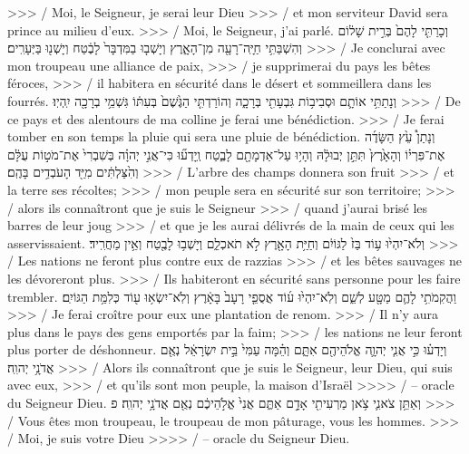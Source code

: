\begin{paracol}[1]
  {>>> / Moi, le Seigneur, je serai leur Dieu
    >>> / et mon serviteur David sera prince au milieu d’eux.
    >>> / Moi, le Seigneur, j’ai parlé.}
  \verset
  {וְכָרַתִּ֤י לָהֶם֙ בְּרִ֣ית שָׁל֔וֹם
    וְהִשְׁבַּתִּ֥י חַיָּֽה־רָעָ֖ה מִן־הָאָ֑רֶץ
    וְיָשְׁב֤וּ בַמִּדְבָּר֙ לָבֶ֔טַח וְיָשְׁנ֖וּ בַּיְּעָרִֽים׃}
  {>>> / Je conclurai avec mon troupeau une alliance de paix,
    >>> / je supprimerai du pays les bêtes féroces,
    >>> / il habitera en sécurité dans le désert et sommeillera dans les fourrés.}
  \verset
  {וְנָתַתִּ֥י אוֹתָ֛ם וּסְבִיב֥וֹת גִּבְעָתִ֖י בְּרָכָ֑ה
    וְהוֹרַדְתִּ֤י הַגֶּ֙שֶׁם֙ בְּעִתּ֔וֹ גִּשְׁמֵ֥י בְרָכָ֖ה יִֽהְיֽוּ׃}
  {>>> / De ce pays et des alentours de ma colline je ferai une bénédiction.
    >>> / Je ferai tomber en son temps la pluie qui sera une pluie de bénédiction.}
  \verset
  {וְנָתַן֩ עֵ֙ץ הַשָּׂדֶ֜ה אֶת־פִּרְי֗וֹ
    וְהָאָ֙רֶץ֙ תִּתֵּ֣ן יְבוּלָ֔הּ
    וְהָי֥וּ עַל־אַדְמָתָ֖ם לָבֶ֑טַח
    וְֽיָדְע֞וּ כִּי־אֲנִ֣י יְהוָ֗ה
    בְּשִׁבְרִי֙ אֶת־מֹט֣וֹת עֻלָּ֔ם
    וְהִ֙צַּלְתִּ֔ים מִיַּ֖ד הָעֹבְדִ֥ים בָּהֶֽם׃}
  {>>> / L’arbre des champs donnera son fruit
    >>> / et la terre ses récoltes;
    >>> / mon peuple sera en sécurité sur son territoire;
    >>> / alors ils connaîtront que je suis le Seigneur
    >>> / quand j’aurai brisé les barres de leur joug
    >>> / et que je les aurai délivrés de la main de ceux qui les asservissaient.}
  \verset
  {וְלֹא־יִהְי֙וּ ע֥וֹד בַּז֙ לַגּוֹיִ֔ם
    וְחַיַּ֥ת הָאָ֖רֶץ לֹ֣א תֹאכְלֵ֑ם
    וְיָשְׁב֥וּ לָבֶ֖טַח וְאֵ֥ין מַחֲרִֽיד׃}
  {>>> / Les nations ne feront plus contre eux de razzias
    >>> / et les bêtes sauvages ne les dévoreront plus.
    >>> / Ils habiteront en sécurité sans personne pour les faire trembler.}
  \verset
  {וַהֲקִמֹתִ֥י לָהֶ֛ם מַטָּ֖ע לְשֵׁ֑ם
    וְלֹֽא־יִהְי֙וּ ע֜וֹד אֲסֻפֵ֤י רָעָב֙ בָּאָ֔רֶץ
    וְלֹֽא־יִשְׂא֥וּ ע֖וֹד כְּלִמַּ֥ת הַגּוֹיִֽם׃}
  {>>> / Je ferai croître pour eux une plantation de renom.
    >>> / Il n’y aura plus dans le pays des gens emportés par la faim;
    >>> / les nations ne leur feront plus porter de déshonneur.}
  \verseSpace
  \verset
  {וְיָדְע֗וּ כִּ֣י אֲנִ֧י יְהוָ֛ה אֱלֹהֵיהֶ֖ם אִתָּ֑ם
    וְהֵ֗מָּה עַמִּי֙ בֵּ֣ית יִשְׂרָאֵ֔ל
    נְאֻ֖ם אֲדֹנָ֥י יְהוִֽה׃}
  {>>> / Alors ils connaîtront que je suis le Seigneur, leur Dieu, qui suis avec eux,
    >>> / et qu’ils sont mon peuple, la maison d’Israël
    >>>> / – oracle du Seigneur Dieu.}
  \verset
  {וְאַתֵּ֥ן צֹאנִ֛י צֹ֥אן מַרְעִיתִ֖י אָדָ֣ם אַתֶּ֑ם
    אֲנִי֙ אֱלֹ֣הֵיכֶ֔ם
    נְאֻ֖ם אֲדֹנָ֥י יְהוִֽה׃ פ}
  {>>> / Vous êtes mon troupeau, le troupeau de mon pâturage, vous les hommes.
    >>> / Moi, je suis votre Dieu
    >>>> / – oracle du Seigneur Dieu.}
  \clearpage


\end{paracol}
